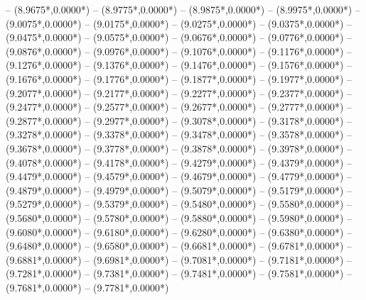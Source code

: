 {	-- ({8.9675*\dx},{0.0000*\dy})
	-- ({8.9775*\dx},{0.0000*\dy})
	-- ({8.9875*\dx},{0.0000*\dy})
	-- ({8.9975*\dx},{0.0000*\dy})
	-- ({9.0075*\dx},{0.0000*\dy})
	-- ({9.0175*\dx},{0.0000*\dy})
	-- ({9.0275*\dx},{0.0000*\dy})
	-- ({9.0375*\dx},{0.0000*\dy})
	-- ({9.0475*\dx},{0.0000*\dy})
	-- ({9.0575*\dx},{0.0000*\dy})
	-- ({9.0676*\dx},{0.0000*\dy})
	-- ({9.0776*\dx},{0.0000*\dy})
	-- ({9.0876*\dx},{0.0000*\dy})
	-- ({9.0976*\dx},{0.0000*\dy})
	-- ({9.1076*\dx},{0.0000*\dy})
	-- ({9.1176*\dx},{0.0000*\dy})
	-- ({9.1276*\dx},{0.0000*\dy})
	-- ({9.1376*\dx},{0.0000*\dy})
	-- ({9.1476*\dx},{0.0000*\dy})
	-- ({9.1576*\dx},{0.0000*\dy})
	-- ({9.1676*\dx},{0.0000*\dy})
	-- ({9.1776*\dx},{0.0000*\dy})
	-- ({9.1877*\dx},{0.0000*\dy})
	-- ({9.1977*\dx},{0.0000*\dy})
	-- ({9.2077*\dx},{0.0000*\dy})
	-- ({9.2177*\dx},{0.0000*\dy})
	-- ({9.2277*\dx},{0.0000*\dy})
	-- ({9.2377*\dx},{0.0000*\dy})
	-- ({9.2477*\dx},{0.0000*\dy})
	-- ({9.2577*\dx},{0.0000*\dy})
	-- ({9.2677*\dx},{0.0000*\dy})
	-- ({9.2777*\dx},{0.0000*\dy})
	-- ({9.2877*\dx},{0.0000*\dy})
	-- ({9.2977*\dx},{0.0000*\dy})
	-- ({9.3078*\dx},{0.0000*\dy})
	-- ({9.3178*\dx},{0.0000*\dy})
	-- ({9.3278*\dx},{0.0000*\dy})
	-- ({9.3378*\dx},{0.0000*\dy})
	-- ({9.3478*\dx},{0.0000*\dy})
	-- ({9.3578*\dx},{0.0000*\dy})
	-- ({9.3678*\dx},{0.0000*\dy})
	-- ({9.3778*\dx},{0.0000*\dy})
	-- ({9.3878*\dx},{0.0000*\dy})
	-- ({9.3978*\dx},{0.0000*\dy})
	-- ({9.4078*\dx},{0.0000*\dy})
	-- ({9.4178*\dx},{0.0000*\dy})
	-- ({9.4279*\dx},{0.0000*\dy})
	-- ({9.4379*\dx},{0.0000*\dy})
	-- ({9.4479*\dx},{0.0000*\dy})
	-- ({9.4579*\dx},{0.0000*\dy})
	-- ({9.4679*\dx},{0.0000*\dy})
	-- ({9.4779*\dx},{0.0000*\dy})
	-- ({9.4879*\dx},{0.0000*\dy})
	-- ({9.4979*\dx},{0.0000*\dy})
	-- ({9.5079*\dx},{0.0000*\dy})
	-- ({9.5179*\dx},{0.0000*\dy})
	-- ({9.5279*\dx},{0.0000*\dy})
	-- ({9.5379*\dx},{0.0000*\dy})
	-- ({9.5480*\dx},{0.0000*\dy})
	-- ({9.5580*\dx},{0.0000*\dy})
	-- ({9.5680*\dx},{0.0000*\dy})
	-- ({9.5780*\dx},{0.0000*\dy})
	-- ({9.5880*\dx},{0.0000*\dy})
	-- ({9.5980*\dx},{0.0000*\dy})
	-- ({9.6080*\dx},{0.0000*\dy})
	-- ({9.6180*\dx},{0.0000*\dy})
	-- ({9.6280*\dx},{0.0000*\dy})
	-- ({9.6380*\dx},{0.0000*\dy})
	-- ({9.6480*\dx},{0.0000*\dy})
	-- ({9.6580*\dx},{0.0000*\dy})
	-- ({9.6681*\dx},{0.0000*\dy})
	-- ({9.6781*\dx},{0.0000*\dy})
	-- ({9.6881*\dx},{0.0000*\dy})
	-- ({9.6981*\dx},{0.0000*\dy})
	-- ({9.7081*\dx},{0.0000*\dy})
	-- ({9.7181*\dx},{0.0000*\dy})
	-- ({9.7281*\dx},{0.0000*\dy})
	-- ({9.7381*\dx},{0.0000*\dy})
	-- ({9.7481*\dx},{0.0000*\dy})
	-- ({9.7581*\dx},{0.0000*\dy})
	-- ({9.7681*\dx},{0.0000*\dy})
	-- ({9.7781*\dx},{0.0000*\dy})
}
